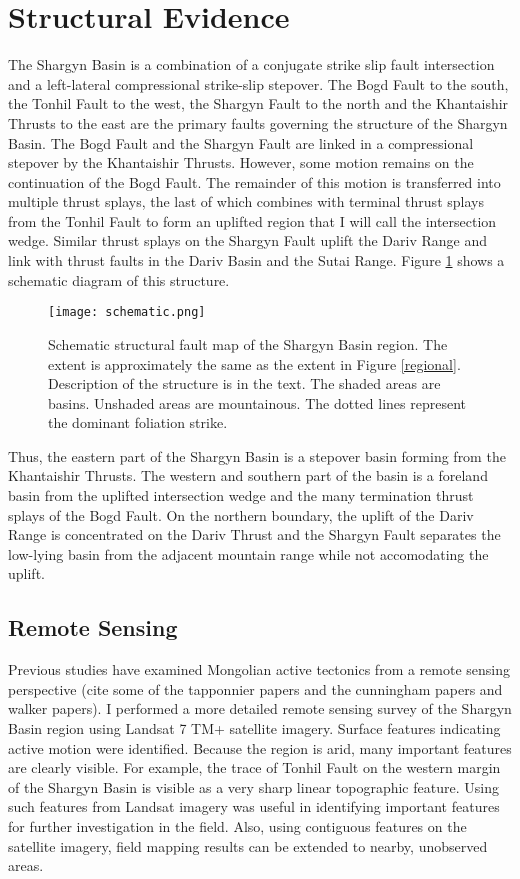 \section{Structural Evidence}
The Shargyn Basin is a combination of a conjugate strike slip fault intersection and a left-lateral compressional strike-slip stepover. The Bogd Fault to the south, the Tonhil Fault to the west, the Shargyn Fault to the north and the Khantaishir Thrusts to the east are the primary faults governing the structure of the Shargyn Basin. The Bogd Fault and the Shargyn Fault are linked in a compressional stepover by the Khantaishir Thrusts. However, some motion remains on the continuation of the Bogd Fault. The remainder of this motion is transferred into multiple thrust splays, the last of which combines with terminal thrust splays from the Tonhil Fault to form an uplifted region that I will call the intersection wedge. Similar thrust splays on the Shargyn Fault uplift the Dariv Range and link with thrust faults in the Dariv Basin and the Sutai Range. Figure \ref{schematic} shows a schematic diagram of this structure.

\begin{figure}[h!]
  \centering
  \texttt{[image: schematic.png]}
  \caption{Schematic structural fault map of the Shargyn Basin region. The extent is approximately the same as the extent in Figure \ref{regional}. Description of the structure is in the text. The shaded areas are basins. Unshaded areas are mountainous. The dotted lines represent the dominant foliation strike.}
  \label{schematic}
\end{figure}

	Thus, the eastern part of the Shargyn Basin is a stepover basin forming from the Khantaishir Thrusts. The western and southern part of the basin is a foreland basin from the uplifted intersection wedge and the many termination thrust splays of the Bogd Fault. On the northern boundary, the uplift of the Dariv Range is concentrated on the Dariv Thrust and the Shargyn Fault separates the low-lying basin from the adjacent mountain range while not accomodating the uplift.
\subsection{Remote Sensing}
Previous studies have examined Mongolian active tectonics from a remote sensing perspective (cite some of the tapponnier papers and the cunningham papers and walker papers). I performed a more detailed remote sensing survey of the Shargyn Basin region using Landsat 7 TM+ satellite imagery. Surface features indicating active motion were identified. Because the region is arid, many important features are clearly visible. For example, the trace of Tonhil Fault on the western margin of the Shargyn Basin is visible as a very sharp linear topographic feature. Using such features from Landsat imagery was useful in identifying important features for further investigation in the field. Also, using contiguous features on the satellite imagery, field mapping results can be extended to nearby, unobserved areas.

